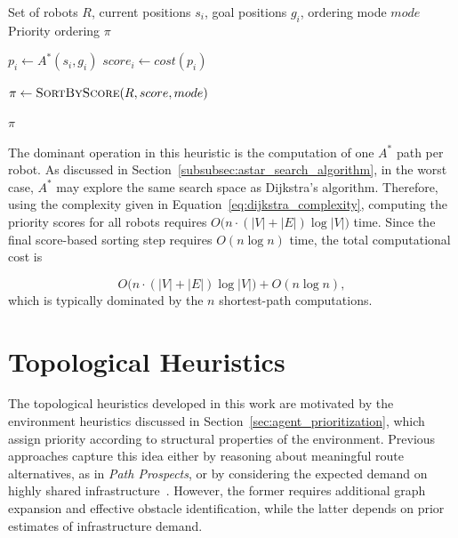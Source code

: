 \begin{algorithm}[H]
\caption{Longest Path Heuristic}
\label{alg:longest_path}
\begin{algorithmic}[1]
\Require Set of robots \(R\), current positions \(s_i\), goal positions \(g_i\), ordering mode \(mode\)
\Ensure Priority ordering \(\pi\)

    \State \(p_i \gets A^*(s_i, g_i)\) 
    \State \(score_i \gets cost(p_i)\) 
\EndFor

\State \(\pi \gets \textsc{SortByScore}(R, score, mode)\)

\State \Return \(\pi\)
\end{algorithmic}
\end{algorithm}

The dominant operation in this heuristic is the computation of one \(A^*\) path per robot. As discussed in Section~\ref{subsubsec:astar_search_algorithm}, in the worst case, \(A^*\) may explore the same search space as Dijkstra's algorithm. Therefore, using the complexity given in Equation~\ref{eq:dijkstra_complexity}, computing the priority scores for all robots requires \(O\bigl(n \cdot (|V| + |E|)\log |V|\bigr)\) time. Since the final score-based sorting step requires \(O(n \log n)\) time, the total computational cost is

\begin{equation}
    O\bigl(n \cdot (|V| + |E|)\log|V|\bigr) + O(n \log n),
\end{equation}
which is typically dominated by the \(n\) shortest-path computations.


\section{Topological Heuristics}
\label{sec:topological_heuristics}
\hspace{\parindent}
The topological heuristics developed in this work are motivated by the environment heuristics
discussed in Section~\ref{sec:agent_prioritization}, which assign priority according to structural
properties of the environment. Previous approaches capture this idea either by reasoning about meaningful route alternatives, as in
\emph{Path Prospects}, or by considering the expected demand on highly shared
infrastructure~\cite{wu2020pathprospects,termors2011evaluating}. However, the former requires
additional graph expansion and effective obstacle
identification, while the latter depends on prior
estimates of infrastructure demand.

